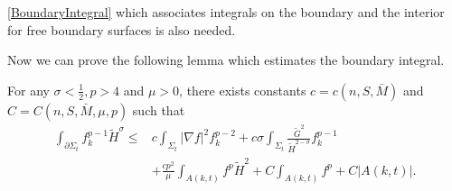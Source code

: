 \autoref{BoundaryIntegral} which associates integrals on the boundary and the interior for free boundary surfaces is also needed.

Now we can prove the following lemma which estimates the boundary integral.

\begin{lemma} \label{BoundaryFH}
    For any $\sigma <\frac{1}{2}, p>4$ and $\mu >0$, there exists constants $c=c(n,S,\bar{M})$ and $C=C(n,S,\bar{M},\mu ,p)$ such that
    \begin{equation*}
    \begin{split}
        \int_{\partial \Sigma_t} f_{k}^{p-1}\tilde{H}^{\sigma } 
    \leq & c \int_{\Sigma_t} \left| \nabla f \right| ^2 f_{k}^{p-2} +c \sigma \int_{\Sigma_t} \frac{\tilde{G}^{2} }{\tilde{H}^{2-\sigma }  }f_{k}^{p-1} \\
    &+ \frac{cp^2}{\mu }\int_{A(k,t)}^{}f^p \tilde{H}^{2} + C \int_{A(k,t)}^{}f^p + C \left| A(k,t) \right| .
    \end{split}
    \end{equation*} 
\end{lemma}

